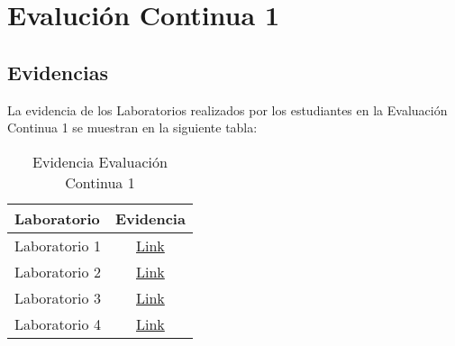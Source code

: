 \chapter{Evalución Continua 1}
\newpage





\pagestyle{empty} %

\section{Evidencias}
La evidencia de los Laboratorios realizados por los estudiantes en la Evaluación Continua 1 se muestran en la siguiente tabla:

\begin{table}[h]
\centering
\begin{tabular}{l|c}
\hline
\textbf{Laboratorio} & 
\textbf{Evidencia} 
\\ \hline
Laboratorio 1 &
\href{https://drive.google.com/drive/folders/0B4QL7QHQ91XKfjJHZ0VpTmYxaDRfclZQal9IZ1JNUG9EcFdCcWdfN0NiRkJjaXJiNlhiS0E?usp=sharing}{Link}
\\ \hline
Laboratorio 2 &
\href{https://drive.google.com/drive/folders/0B4QL7QHQ91XKfjJHZ0VpTmYxaDRfclZQal9IZ1JNUG9EcFdCcWdfN0NiRkJjaXJiNlhiS0E?usp=sharing}{Link}
\\ \hline
Laboratorio 3 &
\href{https://drive.google.com/drive/folders/0B4QL7QHQ91XKfjJHZ0VpTmYxaDRfclZQal9IZ1JNUG9EcFdCcWdfN0NiRkJjaXJiNlhiS0E?usp=sharing}{Link}
\\ \hline
Laboratorio 4 &
\href{https://drive.google.com/drive/folders/0B4QL7QHQ91XKfjJHZ0VpTmYxaDRfclZQal9IZ1JNUG9EcFdCcWdfN0NiRkJjaXJiNlhiS0E?usp=sharing}{Link}
\\ \hline
\end{tabular}
\caption{Evidencia Evaluación Continua 1}
\label{tab:evidencia_evaluacion_continua_1} %
\end{table}

